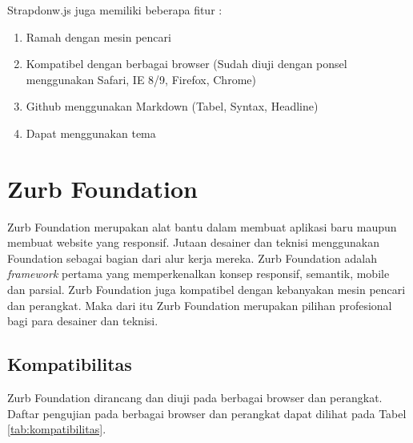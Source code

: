\begin{enumerate}
Strapdonw.js juga memiliki beberapa fitur :
\begin{enumerate}
\item Ramah dengan mesin pencari
\item Kompatibel dengan berbagai browser (Sudah diuji dengan ponsel menggunakan Safari, IE 8/9, Firefox, Chrome)
\item Github menggunakan Markdown (Tabel, Syntax, Headline)
\item Dapat menggunakan tema
\end{enumerate}

\section{Zurb Foundation \cite{Zurb:2015}}
\label{sec:zurbfoundation}

Zurb Foundation merupakan alat bantu dalam membuat aplikasi baru maupun membuat website yang responsif. Jutaan desainer dan teknisi menggunakan Foundation sebagai bagian dari alur kerja mereka. Zurb Foundation adalah {\it framework} pertama yang memperkenalkan konsep responsif, semantik, mobile dan parsial. Zurb Foundation juga kompatibel dengan kebanyakan mesin pencari dan perangkat. Maka dari itu Zurb Foundation merupakan pilihan profesional bagi para desainer dan teknisi.

\subsection{Kompatibilitas}
Zurb Foundation dirancang dan diuji pada berbagai browser dan perangkat. Daftar pengujian pada berbagai browser dan perangkat dapat dilihat pada Tabel \ref{tab:kompatibilitas}.


\end{enumerate}
